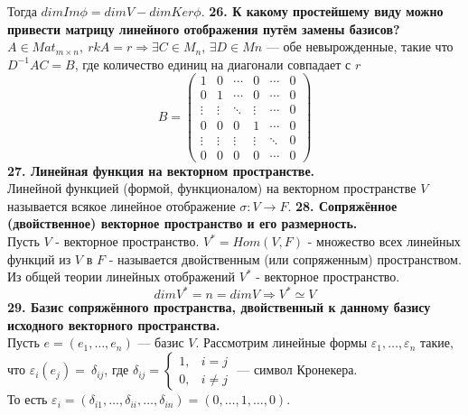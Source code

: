 \documentclass{article}
\begin{document}
Тогда $dim Im \phi = dim V - dim Ker \phi$.
\newline
\newline
\textbf{26. К какому простейшему виду можно привести матрицу линейного отображения путём замены базисов?}\\
$A \in Mat_{m\times n}, ~rkA=r \Rightarrow \exists C\in M_n$, $\exists D \in Mn$ --- обе невырожденные, такие что $D^{-1}AC=B$, где количество единиц на диагонали совпадает с $r$
$$
B=
\begin{pmatrix}
1 & 0 & \cdots & 0 &  \cdots & 0 \\
0 & 1 & \cdots & 0 &  \cdots & 0 \\
\vdots & \vdots & \ddots & \vdots& \cdots & 0\\
0 & 0 & 0 & 1&  \cdots & 0\\
\vdots & \vdots & \vdots & \vdots &  \ddots & 0\\
0 & 0 & 0 & 0 & \cdots &0 
\end{pmatrix}
$$
\newline
\newline
\textbf{27. Линейная функция на векторном пространстве.}\\
Линейной функцией (формой, функционалом) на векторном пространстве $V$ называется всякое линейное отображение $\sigma \colon V \rightarrow F$.
\newline
\newline
\textbf{28. Сопряжённое (двойственное) векторное пространство и его размерность.}\\
Пусть $V$ - векторное пространство. $V^*=Hom(V,F)$ - множество всех линейных функций из  $V$ в $F$ - называется двойственным (или сопряженным) пространством.\\ 
Из общей теории линейных отображений $V^*$ - векторное пространство.
    $$dimV^*=n=dimV \Rightarrow V^* \simeq V$$
\newline
\newline
\textbf{29. Базис сопряжённого пространства, двойственный к данному базису исходного векторного пространства.}\\
Пусть $e = (e_1, \ldots, e_n)$ --- базис $V$. Рассмотрим линейные формы $\varepsilon_1, \ldots, \varepsilon_n$ такие, что $\varepsilon_i(e_j) =~\delta_{ij}$, где $\delta_{ij} =
\begin{cases}
1, & i = j \\
0, & i \neq j
\end{cases}
$ --- символ Кронекера. \\То есть $\varepsilon_i = (\delta_{i1}, \ldots, \delta_{ii}, \ldots, \delta_{in}) = (0, \ldots, 1, \ldots, 0)$.
\end{document}
